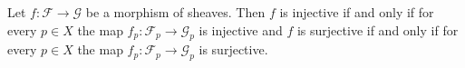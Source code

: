 Let $f\colon \mathcal{F}\to \mathcal{G}$ be a morphism of sheaves. Then
$f$ is injective if and only if for every $p \in X$ the map $f_p\colon \mathcal{F}_p \to \mathcal{G}_p$ is injective
and $f$ is surjective if and only if for every $p \in X$ the map $f_p\colon \mathcal{F}_p\to \mathcal{G}_p$ is surjective.

